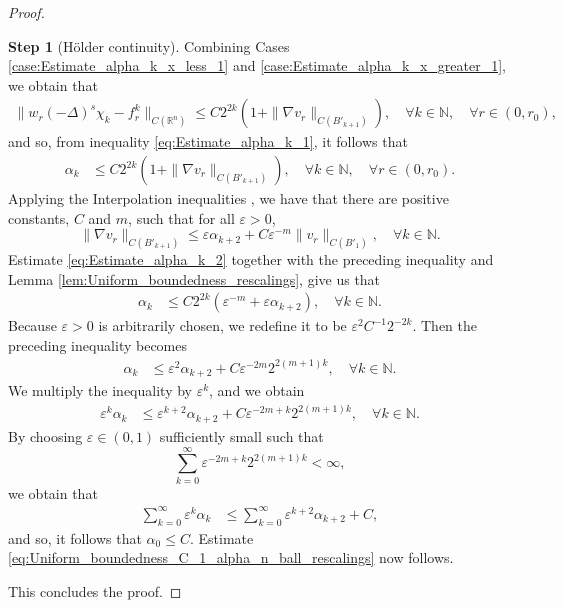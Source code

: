 \documentclass[11pt,reqno]{amsart}
\theoremstyle{definition}
\newtheorem{step}{Step}
\theoremstyle{remark}
\begin{document}
\begin{proof}
\begin{step}[H\"older continuity]
Combining Cases \ref{case:Estimate_alpha_k_x_less_1} and \ref{case:Estimate_alpha_k_x_greater_1}, we obtain that
\begin{align*}
\|w_r(-\Delta)^s\chi_k -f^k_r\|_{C({\mathbb{R}}^n)}\leq C 2^{2k}(1+\|\nabla v_r\|_{C(B'_{k+1})}),\quad\forall k \in {\mathbb{N}},\quad\forall r\in (0,r_0),
\end{align*}
and so, from inequality \eqref{eq:Estimate_alpha_k_1}, it follows that
\begin{align}
\label{eq:Estimate_alpha_k_2}
\alpha_k &\leq C 2^{2k}\left(1+\|\nabla v_r\|_{C(B'_{k+1})}\right),\quad\forall k\in{\mathbb{N}},\quad\forall r\in (0,r_0).
\end{align}
Applying the Interpolation inequalities \cite[Theorems 3.2.1 \& 8.8.1]{Krylov_LecturesHolder}, we have that there are positive constants, $C$ and $m$, such that for all ${\varepsilon}>0$, 
$$
\|\nabla v_r\|_{C(B'_{k+1})} \leq {\varepsilon} \alpha_{k+2} + C{\varepsilon}^{-m} \|v_r\|_{C(B'_1)},\quad\forall k\in{\mathbb{N}}.
$$
Estimate \eqref{eq:Estimate_alpha_k_2} together with the preceding inequality and Lemma \ref{lem:Uniform_boundedness_rescalings}, give us that
\begin{align*}
\alpha_k &\leq C 2^{2k}({\varepsilon}^{-m}+{\varepsilon} \alpha_{k+2}),\quad\forall k\in{\mathbb{N}}.
\end{align*}
Because ${\varepsilon}>0$ is arbitrarily chosen, we redefine it to be ${\varepsilon}^2 C^{-1}2^{-2k}$. Then the preceding inequality becomes
\begin{align*}
\alpha_k &\leq {\varepsilon}^2\alpha_{k+2} + C {\varepsilon}^{-2m} 2^{2(m+1)k},\quad\forall k\in{\mathbb{N}}.
\end{align*}
We multiply the inequality by ${\varepsilon}^k$, and we obtain
\begin{align*}
{\varepsilon}^k\alpha_k &\leq {\varepsilon}^{k+2}\alpha_{k+2} + C {\varepsilon}^{-2m+k} 2^{2(m+1)k},\quad\forall k\in{\mathbb{N}}.
\end{align*}
By choosing ${\varepsilon} \in (0,1)$ sufficiently small such that
$$
\sum_{k=0}^{\infty} {\varepsilon}^{-2m+k} 2^{2(m+1)k} <\infty,
$$
we obtain that
\begin{align*}
\sum_{k=0}^{\infty}{\varepsilon}^k\alpha_k &\leq \sum_{k=0}^{\infty}{\varepsilon}^{k+2}\alpha_{k+2} + C, 
\end{align*}
and so, it follows that $\alpha_0 \leq C$. Estimate \eqref{eq:Uniform_boundedness_C_1_alpha_n_ball_rescalings} now follows.
\end{step}
This concludes the proof.
\end{proof}
\end{document}
